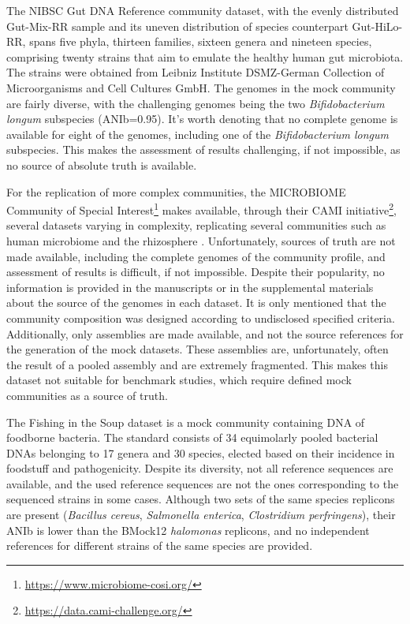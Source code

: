 The NIBSC Gut DNA Reference community dataset, with the evenly distributed Gut-Mix-RR sample and its uneven distribution of species counterpart Gut-HiLo-RR, spans five phyla, thirteen families, sixteen genera and nineteen species, comprising twenty strains that aim to emulate the healthy human gut microbiota. The strains were obtained from Leibniz Institute DSMZ-German Collection of Microorganisms and Cell Cultures GmbH. The genomes in the mock community are fairly diverse, with the challenging genomes being the two \textit{Bifidobacterium longum} subspecies (ANIb=0.95). It’s worth denoting that no complete genome is available for eight of the genomes, including one of the \textit{Bifidobacterium longum} subspecies. This makes the assessment of results challenging, if not impossible, as no source of absolute truth is available. 

For the replication of more complex communities, the MICROBIOME Community of Special Interest\footnote{\url{https://www.microbiome-cosi.org/}} makes available, through their \ac{CAMI} initiative\footnote{\url{https://data.cami-challenge.org/}}, several datasets varying in complexity, replicating several communities such as human microbiome and the rhizosphere \citep{sczyrba_critical_2017, meyer_critical_2022}. Unfortunately, sources of truth are not made available, including the complete genomes of the community profile, and assessment of results is difficult, if not impossible. Despite their popularity, no information is provided in the manuscripts or in the supplemental materials about the source of the genomes in each dataset. It is only mentioned that the community composition was designed according to undisclosed specified criteria. Additionally, only assemblies are made available, and not the source references for the generation of the mock datasets. These assemblies are, unfortunately, often the result of a pooled assembly and are extremely fragmented. This makes this dataset not suitable for benchmark studies, which require defined mock communities as a source of truth. 

The Fishing in the Soup dataset \citep{grutzke_fishing_2019} is a mock community containing DNA of foodborne bacteria. The standard consists of 34 equimolarly pooled bacterial DNAs belonging to 17 genera and 30 species, elected based on their incidence in foodstuff and pathogenicity. Despite its diversity, not all reference sequences are available, and the used reference sequences are not the ones corresponding to the sequenced strains in some cases. Although two sets of the same species replicons are present (\textit{Bacillus cereus}, \textit{Salmonella enterica}, \textit{Clostridium perfringens}), their ANIb is lower than the BMock12 \textit{halomonas} replicons, and no independent references for different strains of the same species are provided. 

